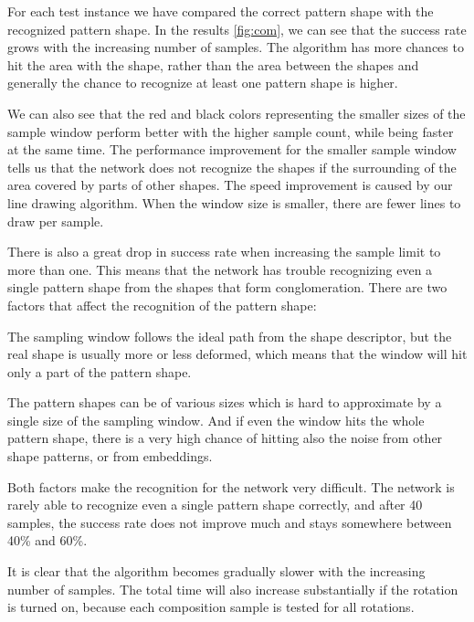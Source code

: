 For each test instance we have compared the correct pattern shape with the recognized pattern shape.
In the results \ref{fig:com}, we can see that the success rate grows with the increasing number of samples. The algorithm has more chances to hit the area with the shape, rather than the area between the shapes and generally the chance to recognize at least one pattern shape is higher.

We can also see that the red and black colors representing the smaller sizes of the sample window perform better with the higher sample count, while being faster at the same time. The performance improvement for the smaller sample window tells us that the network does not recognize the shapes if the surrounding of the area covered by parts of other shapes. The speed improvement is caused by our line drawing algorithm. When the window size is smaller, there are fewer lines to draw per sample.

There is also a great drop in success rate when increasing the sample limit to more than one. This means that the network has trouble recognizing even a single pattern shape from the shapes that form conglomeration. There are two factors that affect the recognition of the pattern shape:
\begin{description} 
\item The sampling window follows the ideal path from the shape descriptor, but the real shape is usually more or less deformed, which means that the window will hit only a part of the pattern shape. 
\item The pattern shapes can be of various sizes which is hard to approximate by a single size of the sampling window. And if even the window hits the whole pattern shape, there is a very high chance of hitting also the noise from other shape patterns, or from embeddings.
\end{description}
Both factors make the recognition for the network very difficult. The network is rarely able to recognize even a single pattern shape correctly, and after 40 samples, the success rate does not improve much and stays somewhere between 40\% and 60\%.

It is clear that the algorithm becomes gradually slower with the increasing number of samples. The total time will also increase substantially if the rotation is turned on, because each composition sample is tested for all rotations.

